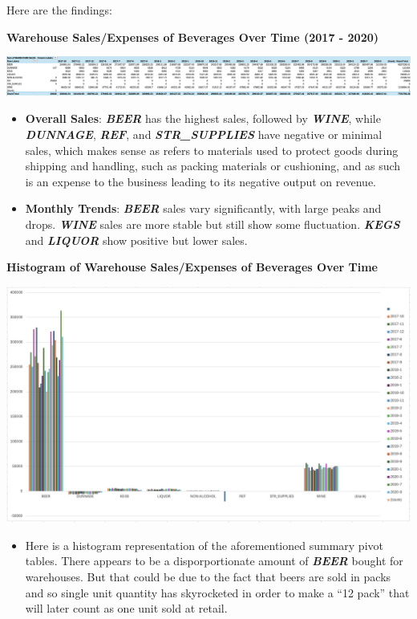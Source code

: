 \documentclass[
  letterpaper,
  DIV=11,
  numbers=noendperiod]{scrreprt}
\providecommand{\tightlist}{%
  \setlength{\itemsep}{0pt}\setlength{\parskip}{0pt}}\usepackage{longtable,booktabs,array}
\begin{document}
Here are the findings:

\textbf{Warehouse Sales/Expenses of Beverages Over Time (2017 - 2020)}

\includegraphics{pivot_table_baruga.png}

\begin{itemize}
\tightlist
\item
  \textbf{Overall Sales}: \textbf{\emph{BEER}} has the highest sales,
  followed by \textbf{\emph{WINE}}, while \textbf{\emph{DUNNAGE}},
  \textbf{\emph{REF}}, and \textbf{\emph{STR\_SUPPLIES}} have negative
  or minimal sales, which makes sense as refers to materials used to
  protect goods during shipping and handling, such as packing materials
  or cushioning, and as such is an expense to the business leading to
  its negative output on revenue.
\item
  \textbf{Monthly Trends}: \textbf{\emph{BEER}} sales vary
  significantly, with large peaks and drops. \textbf{\emph{WINE}} sales
  are more stable but still show some fluctuation. \textbf{\emph{KEGS}}
  and \textbf{\emph{LIQUOR}} show positive but lower sales.
\end{itemize}

\textbf{Histogram of Warehouse Sales/Expenses of Beverages Over Time}

\includegraphics{pivot_chart.png}

\begin{itemize}
\tightlist
\item
  Here is a histogram representation of the aforementioned summary pivot
  tables. There appears to be a disporportionate amount of
  \textbf{\emph{BEER}} bought for warehouses. But that could be due to
  the fact that beers are sold in packs and so single unit quantity has
  skyrocketed in order to make a ``12 pack'' that will later count as
  one unit sold at retail.
\end{itemize}
\end{document}
